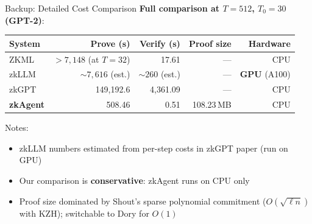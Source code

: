 \documentclass[aspectratio=169,10pt]{beamer}
\newcommand{\pos}[1]{\textcolor{positive}{#1}}
\begin{document}
\begin{frame}{Backup: Detailed Cost Comparison}
\textbf{Full comparison at $T = 512$, $T_0 = 30$ (GPT-2)}:

\vspace{4pt}
\begin{center}
\begin{tabular}{@{}lrrrr@{}}
\toprule
System & Prove (s) & Verify (s) & Proof size & Hardware \\
\midrule
ZKML & $>7{,}148$ (at $T\!=\!32$) & 17.61 & --- & CPU \\
zkLLM & $\sim 7{,}616$ (est.) & $\sim 260$ (est.) & --- & \textbf{GPU} (A100) \\
zkGPT & 149,192.6 & 4,361.09 & --- & CPU \\
\midrule
\textbf{zkAgent} & \pos{508.46} & \pos{0.51} & 108.23\,MB & CPU \\
\bottomrule
\end{tabular}
\end{center}

\vspace{4pt}
Notes:
\begin{itemize}
  \item zkLLM numbers estimated from per-step costs in zkGPT paper (run on GPU)
  \item Our comparison is \textbf{conservative}: zkAgent runs on CPU only
  \item Proof size dominated by Shout's sparse polynomial commitment ($O(\sqrt{\ell n})$ with KZH); switchable to Dory for $O(1)$
\end{itemize}
\end{frame}
\end{document}
